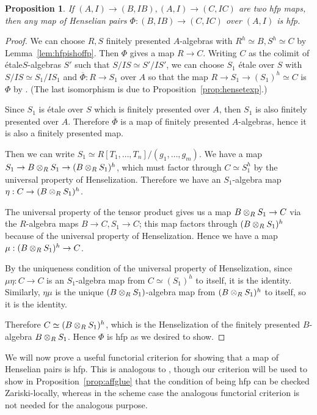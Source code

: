 \documentclass[12pt]{article}
\newcommand{\ol}[1]{\overline{#1}}
\newcommand{\Et}{\'etale\xspace}
\newcommand{\hfp}{hfp\xspace}
\newcommand{\spcite}[2]{\cite[\href{https://stacks.math.columbia.edu/tag/#1}{{#2} {#1}}]{stackp}}
\newtheorem{proposition}[theorem]{Proposition}
\theoremstyle{definition}
\numberwithin{equation}{subsection}
\begin{document}
\begin{proposition}\label{prop:hlfphlfp} If $(A,I) \to (B,IB), (A,I) \to (C,IC)$ are two \hfp maps, then any map of Henselian pairs $\Phi: (B,IB) \to (C,IC)$ over $(A,I)$ is \hfp.
\end{proposition}
\begin{proof} We can choose $R,S$ finitely presented $A$-algebras with $R^h \simeq B, S^h \simeq C$ by Lemma~\ref{lem:hfpishoffp}. Then $\Phi$ gives a map $R \to C$. Writing $C$ as the colimit of \Et $S$-algebras $S'$ such that $S/IS \simeq S'/IS'$, we can choose $S_1$ \Et over $S$ with $S/IS \simeq S_1/IS_1$ and $\ol{\Phi}: R \to S_1$ over $A$ so that the map  $R \to S_1 \to (S_1)^h \simeq C$ is $\Phi$ by \spcite{00QO}{Lemma}. (The last isomorphism is due to Proposition~\ref{prop:hensetexp}.)

Since $S_1$ is \Et over $S$ which is finitely presented over $A$, then $S_1$ is also finitely presented over $A$. Therefore $\ol{\Phi}$ is a map of finitely presented $A$-algebras, hence it is also a finitely presented map.

Then we can write $S_1 \simeq R[T_1,\dots,T_n]/(g_1,\dots,g_m)$. We have a map $S_1 \to B \tens_R S_1 \to (B \tens_R S_1)^h$, which must factor through $C \simeq S_1^h$ by the universal property of Henselization. Therefore we have an $S_1$-algebra map $\eta: C \to (B \tens_R S_1)^h$.

The universal property of the tensor product gives us a map $B \tens_R S_1 \to C$ via the $R$-algebra maps $B \to C, S_1 \to C$; this map factors through $(B \tens_R S_1)^h$ because of the universal property of Henselization. Hence we have a map $\mu: (B \tens_R S_1)^h \to C$.

By the uniqueness condition of the universal property of Henselization, since $\mu\eta: C \to C$ is an $S_1$-algebra map from $C \simeq (S_1)^h$ to itself, it is the identity. Similarly, $\eta\mu$ is the unique $(B \tens_R S_1)$-algebra map from $(B \tens_R S_1)^h$ to itself, so it is the identity.  



Therefore $C \simeq (B \tens_R S_1)^h$, which is the Henselization of the finitely presented $B$-algebra $B \tens_R S_1$. Hence $\Phi$ is \hfp as we desired to show.\end{proof}

We will now prove a useful functorial criterion for showing that a map of Henselian pairs is \hfp. This is analogous to \cite[Proposition 8.14.2]{ega41}, though our criterion will be used to show in Proposition~\ref{prop:affglue} that the condition of being \hfp can be checked Zariski-locally, whereas in the scheme case the analogous functorial criterion is not needed for the analogous purpose.
\end{document}
